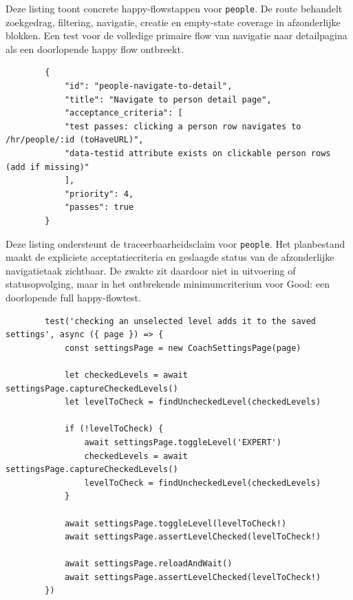 Deze listing toont concrete happy-flowstappen voor \texttt{people}. De route behandelt zoekgedrag, filtering, navigatie, creatie en empty-state coverage in afzonderlijke blokken. Een test voor de volledige primaire flow van navigatie naar detailpagina als een doorlopende happy flow ontbreekt.

\begin{listing}[H]
    \begin{verbatim}
        {
            "id": "people-navigate-to-detail",
            "title": "Navigate to person detail page",
            "acceptance_criteria": [
            "test passes: clicking a person row navigates to /hr/people/:id (toHaveURL)",
            "data-testid attribute exists on clickable person rows (add if missing)"
            ],
            "priority": 4,
            "passes": true
        }
    \end{verbatim}
    \caption{\texttt{people.json}: taak met \texttt{passes: true}.}
    \label{lst:people-plan-passes}
\end{listing}

Deze listing ondersteunt de traceerbaarheidsclaim voor \texttt{people}. Het planbestand maakt de expliciete acceptatiecriteria en geslaagde status van de afzonderlijke navigatietaak zichtbaar. De zwakte zit daardoor niet in uitvoering of statusopvolging, maar in het ontbrekende minimumcriterium voor Good: een doorlopende full happy-flowtest.

\begin{listing}[H]
    \begin{verbatim}
        test('checking an unselected level adds it to the saved settings', async ({ page }) => {
            const settingsPage = new CoachSettingsPage(page)
            
            let checkedLevels = await settingsPage.captureCheckedLevels()
            let levelToCheck = findUncheckedLevel(checkedLevels)
            
            if (!levelToCheck) {
                await settingsPage.toggleLevel('EXPERT')
                checkedLevels = await settingsPage.captureCheckedLevels()
                levelToCheck = findUncheckedLevel(checkedLevels)
            }
            
            await settingsPage.toggleLevel(levelToCheck!)
            await settingsPage.assertLevelChecked(levelToCheck!)
            
            await settingsPage.reloadAndWait()
            await settingsPage.assertLevelChecked(levelToCheck!)
        })
    \end{verbatim}
    \caption{\texttt{coach-settings.spec.ts}: persistente settings-flow.}
    \label{lst:coach-settings-persistence}
\end{listing}

